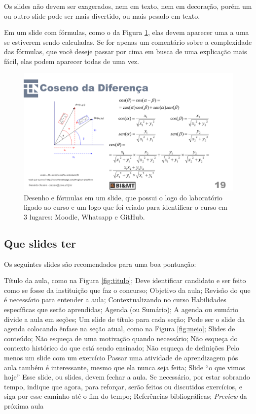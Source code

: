 \documentclass{article}
\def\tam{0.6}
\begin{document}
Os slides não devem ser exagerados, nem em texto, nem em decoração, porém um ou outro slide pode ser mais divertido, ou mais pesado em texto. 

Em um slide com fórmulas, como o da Figura \ref{fig:formulas}, elas devem aparecer uma a uma se estiverem sendo calculadas. Se for apenas um comentário sobre a complexidade das fórmulas, que você deseje passar por cima em busca de uma explicação mais fácil, elas podem aparecer todas de uma vez.

\begin{figure}[hbt]
    \centering
    \includegraphics[width=\tam\linewidth]{imagens/desenhoeformulas.png}
    \caption{Desenho e fórmulas em um slide, que possui o logo do laboratório ligado ao curso e um logo que foi criado para identificar o curso em 3 lugares: Moodle, Whatsapp e GitHub.}
    \label{fig:formulas}
\end{figure}

\subsection{Que slides ter}

Os seguintes slides são recomendados para uma boa pontuação:
\begin{outline}
\1 Título da aula, como na Figura \ref{fig:titulo};
\2 Deve identificar candidato e ser feito como se fosse da instituição que faz o concurso;
\1 Objetivo da aula;
\1 Revisão do que é necessário para entender a aula;
\2 Contextualizando no curso
\1 Habilidades específicas que serão aprendidas;
\1 Agenda (ou Sumário);
\2 A agenda ou sumário divide a aula em seções;
\1 Um slide de título para cada seção;
\2 Pode ser o slide da agenda colocando ênfase na seção atual, como na Figura \ref{fig:meio};
\1 Slides de conteúdo;
\2 Não esqueça de uma motivação quando necessário;
\2 Não esqueça do contexto histórico do que está sendo ensinado;
\2 Não esqueça de definições
\1 Pelo menos um slide com um exercício 
\2 Passar uma atividade de aprendizagem pós aula também é interessante, mesmo que ela nunca seja feita;
\1 Slide ``o que vimos hoje''
\2 Esse slide, ou slides, devem fechar a aula. Se necessário, por estar sobrando tempo, indique que agora, para reforçar, serão feitos ou discutidos exercícios, e siga por esse caminho até o fim do tempo;
\1 Referências bibliográficas;
\1 \textit{Preview} da próxima aula
\end{outline}
\end{document}
